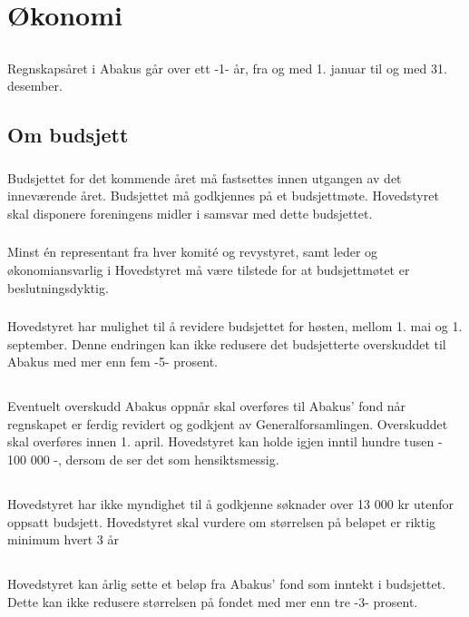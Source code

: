 \section{Økonomi}

\subsection{}
Regnskapsåret i Abakus går over ett -1- år, fra og med 1. januar til og med 31. desember.

\subsection{Om budsjett}
\subsubsection{}
Budsjettet for det kommende året må fastsettes innen utgangen av det inneværende året. Budsjettet må godkjennes på et budsjettmøte. Hovedstyret skal disponere foreningens midler i samsvar med dette budsjettet.

\subsubsection{}
Minst én representant fra hver komité og revystyret, samt leder og økonomiansvarlig i Hovedstyret må være tilstede for at budsjettmøtet er beslutningsdyktig.

\subsubsection{}
Hovedstyret har mulighet til å revidere budsjettet for høsten, mellom 1. mai og 1. september.
Denne endringen kan ikke redusere det budsjetterte overskuddet til Abakus med mer enn fem -5- prosent.

\subsection{}
Eventuelt overskudd Abakus oppnår skal overføres til Abakus’ fond når regnskapet er ferdig revidert og godkjent av Generalforsamlingen. Overskuddet skal overføres innen 1. april. Hovedstyret kan holde igjen inntil hundre tusen - 100 000 -, dersom de ser det som hensiktsmessig.

\subsection{}
Hovedstyret har ikke myndighet til å godkjenne søknader over 13 000 kr utenfor
oppsatt budsjett. Hovedstyret skal vurdere om størrelsen på beløpet er riktig minimum hvert 3 år

\subsection{}
Hovedstyret kan årlig sette et beløp fra Abakus’ fond som inntekt i budsjettet. Dette kan ikke redusere størrelsen på fondet med mer enn tre -3- prosent.
